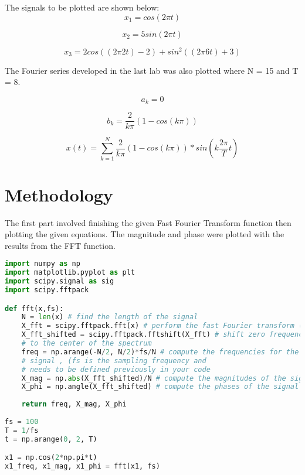 \documentclass[12pt]{report}
\begin{document}
The signals to be plotted are shown below:
\begin{equation*}
x_1 = cos(2\pi t)
\end{equation*}

\begin{equation*}
x_2 = 5sin(2\pi t)
\end{equation*}

\begin{equation*}
x_3 = 2cos((2\pi 2t)-2) + sin^2((2\pi 6t) + 3)
\end{equation*}

The Fourier series developed in the last lab was also plotted where N = 15 and T = 8.

\begin{equation*}
a_k = 0
\end{equation*}

\begin{equation*}
b_k = \frac{2}{k\pi}(1-cos(k\pi))
\end{equation*}

\begin{equation*}
x(t) = \sum_{k=1}^{N} \frac{2}{k\pi}(1-cos(k\pi))*sin(k\frac{2\pi}{T}t)
\end{equation*}


\section{Methodology}
The first part involved finishing the given Fast Fourier Transform function then plotting the given equations. The magnitude and phase were plotted with the results from the FFT function.
\begin{lstlisting}[language=Python, caption=FFT]
import numpy as np
import matplotlib.pyplot as plt
import scipy.signal as sig
import scipy.fftpack

def fft(x,fs):
    N = len(x) # find the length of the signal
    X_fft = scipy.fftpack.fft(x) # perform the fast Fourier transform (fft)
    X_fft_shifted = scipy.fftpack.fftshift(X_fft) # shift zero frequency components
    # to the center of the spectrum
    freq = np.arange(-N/2, N/2)*fs/N # compute the frequencies for the output
    # signal , (fs is the sampling frequency and
    # needs to be defined previously in your code
    X_mag = np.abs(X_fft_shifted)/N # compute the magnitudes of the signal
    X_phi = np.angle(X_fft_shifted) # compute the phases of the signal
    
    return freq, X_mag, X_phi
    
fs = 100
T = 1/fs
t = np.arange(0, 2, T)

x1 = np.cos(2*np.pi*t)
x1_freq, x1_mag, x1_phi = fft(x1, fs)
\end{lstlisting}
\end{document}
